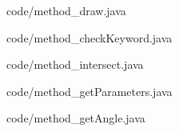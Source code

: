 \documentclass[conference]{IEEEtran}
\begin{document}

{code/method_draw.java}


{code/method_checkKeyword.java}


{code/method_intersect.java}


{code/method_getParameters.java}


{code/method_getAngle.java}
	
\end{document}
